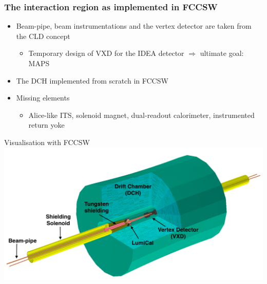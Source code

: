 \documentclass[hyperref={colorlinks=true,pdfpagelabels=false,linkcolor=black}, xcolor=dvipsnames,10pt]{beamer}
\begin{document}
\begin{frame}
	\frametitle{The interaction region as implemented in FCCSW}

	\begin{itemize}
	\item Beam-pipe, beam instrumentations and the vertex detector are taken from the CLD concept
		\begin{itemize}
		\item Temporary design of VXD for the IDEA detector $\Rightarrow $ ultimate goal: MAPS
		\end{itemize}
	\item The DCH implemented from scratch in FCCSW
  \item Missing elements
    \begin{itemize}
      \item Alice-like ITS, solenoid magnet, dual-readout calorimeter, instrumented return yoke
    \end{itemize}
	\end{itemize}

  \vspace{-0.2cm}
	\begin{block}{Visualisation with FCCSW}
	\centering
	\includegraphics[width=\textwidth]{figures/FCCeeIDEA.png}
	\end{block}

\end{frame}
\end{document}
